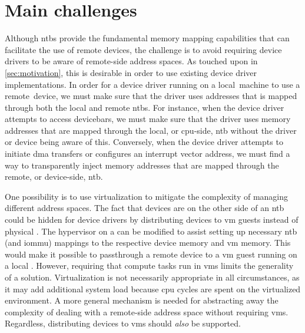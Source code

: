 \section{Main challenges}\label{sec:challenges}
Although \glspl{ntb} provide the fundamental memory mapping capabilities that can facilitate the use of remote devices, the challenge is to avoid requiring device drivers to be aware of remote-side address spaces.
%
As touched upon in \cref{sec:motivation}, this is desirable in order to use existing device driver implementations.
%
In order for a device driver running on a local~machine to use a remote~device, we must make sure that the driver uses addresses that is mapped through both the local and remote \glspl{ntb}.
%
For instance, when the device driver attempts to access \glspl{devicebar}, we must make sure that the driver uses memory addresses that are mapped through the local, or \gls{cpu}-side, \gls{ntb} without the driver or device being aware of this.
%
Conversely, when the device driver attempts to initiate \gls{dma} transfers or configures an interrupt vector address, we must find a way to transparently inject memory addresses that are mapped through the remote, or device-side, \gls{ntb}.




One possibility is to use virtualization to mitigate the complexity of managing different address spaces.
%
The fact that devices are on the other side of an \gls{ntb} could be hidden for device drivers by distributing devices to \gls{vm} \glspl{guest} instead of physical .
%
The \gls{hypervisor} on a  can be modified to assist setting up necessary \gls{ntb} (and \gls{iommu}) mappings to the respective device memory and \gls{vm} memory.
%
This would make it possible to \gls{passthrough} a remote device to a \gls{vm} \gls{guest} running on a local .
%
However, requiring that compute tasks run in \glspl{vm} limits the generality of a solution.
%
Virtualization is not necessarily appropriate in all circumstances, as it may add additional system load because \gls{cpu} cycles are spent on  the virtualized environment.
%
A more general mechanism is needed for abstracting away the complexity of dealing with a remote-side address space without requiring \glspl{vm}.
%
Regardless, distributing devices to \glspl{vm} should \emph{also} be supported.





